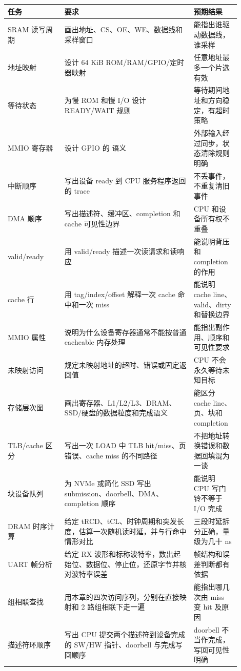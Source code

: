 \begin{longtable}{L{0.22\linewidth}L{0.5\linewidth}L{0.18\linewidth}}
\toprule
任务 & 要求 & 预期结果 \\
\midrule
SRAM 读写周期 & 画出地址、CS、OE、WE、数据线和采样窗口 & 能指出谁驱动数据线，谁采样 \\
地址映射 & 设计 64 KiB ROM/RAM/GPIO/定时器映射 & 任意地址最多一个片选有效 \\
等待状态 & 为慢 ROM 和慢 I/O 设计 READY/WAIT 规则 & 等待期间地址和方向稳定，有超时策略 \\
MMIO 寄存器 & 设计 GPIO 的  语义 & 外部输入经过同步，状态清除规则明确 \\
中断顺序 & 写出设备 ready 到 CPU 服务程序返回的 trace & 不丢事件，不重复清旧事件 \\
DMA 顺序 & 写出描述符、缓冲区、completion 和 cache 可见性边界 & CPU 和设备所有权不重叠 \\
valid/ready & 用 valid/ready 描述一次读请求和读响应 & 能说明背压和 completion 的作用 \\
cache 行 & 用 tag/index/offset 解释一次 cache 命中和一次 miss & 能说明 cache line、valid、dirty 和替换边界 \\
MMIO 属性 & 说明为什么设备寄存器通常不能按普通 cacheable 内存处理 & 能指出副作用、顺序和可见性要求 \\
未映射访问 & 规定未映射地址的超时、错误或固定返回值 & CPU 不会永久等待未知目标 \\
存储层次图 & 画出寄存器、L1/L2/L3、DRAM、SSD/硬盘的数据粒度和完成语义 & 能区分 cache line、页、块和 completion \\
TLB/cache 区分 & 写出一次 LOAD 中 TLB hit/miss、页错误、cache miss 的不同路径 & 不把地址转换错误和数据回填混为一谈 \\
块设备队列 & 为 NVMe 或简化 SSD 写出 submission、doorbell、DMA、completion 顺序 & 能说明 CPU 写门铃不等于 I/O 完成 \\
DRAM 时序计算 & 给定 tRCD、tCL、时钟周期和突发长度，估算一次随机读时延，并与行命中情形对比 & 三段时延拆分正确，量级为几十 ns \\
UART 帧分析 & 给定 RX 波形和标称波特率，数出起始位、数据位、停止位，还原字节并核对波特率误差 & 帧结构和误差判断都有依据 \\
组相联查找 & 用本章的四次访问序列，分别在直接映射和 2 路组相联下走一遍 & 能指出哪几次由 miss 变 hit 及原因 \\
描述符环顺序 & 写出 CPU 提交两个描述符到设备完成的 SW/HW 指针、doorbell 与完成写回顺序 & doorbell 不当作完成，写回可见性明确 \\

\end{longtable}
